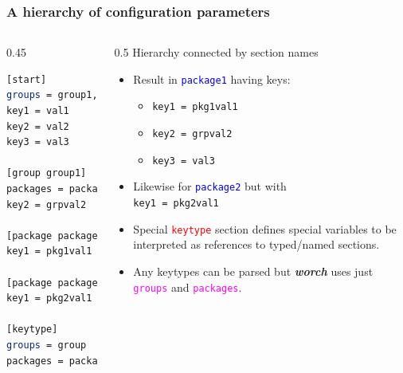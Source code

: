\documentclass[xcolor=dvipsnames]{beamer}
\newcommand{\app}[1]{\textbf{\textit{#1}}\xspace}
\def\worch{\app{worch}}
\begin{document}
\begin{frame}[fragile]
  \frametitle{A hierarchy of configuration parameters} 

  \begin{columns}
    \begin{column}{0.45\textwidth}
  \begin{lstlisting}[language=bash,emph={group,package,keytype},emphstyle=\color{red},emph={[2]group1,package1},emphstyle={[2]\color{blue}},emph={[3]groups,packages},emphstyle={[3]\color{magenta}}]
[start]
groups = group1, group2
key1 = val1
key2 = val2
key3 = val3

[group group1]
packages = package1, package2
key2 = grpval2

[package package1]
key1 = pkg1val1

[package package2]
key1 = pkg2val1

[keytype]
groups = group
packages = package
  \end{lstlisting}
    \end{column}
    \begin{column}{0.5\paperwidth}
      \small
      Hierarchy connected by section names
      \begin{itemize}
      \item Result in \textcolor{blue}{\texttt{package1}} having keys: 
        \begin{itemize}
        \item \texttt{key1 = pkg1val1}
        \item \texttt{key2 = grpval2}
        \item \texttt{key3 = val3}      
        \end{itemize}
      \item Likewise for \textcolor{blue}{\texttt{package2}} but with \\
        \texttt{key1 = pkg2val1}
      \item Special \textcolor{red}{\texttt{keytype}} section defines special variables to be
        interpreted as references to typed/named sections.
      \item Any keytypes can be parsed but \worch uses just \textcolor{magenta}{\texttt{groups}}
        and \textcolor{magenta}{\texttt{packages}}.
      \end{itemize}
    \end{column}
  \end{columns}

\end{frame}
\end{document}
